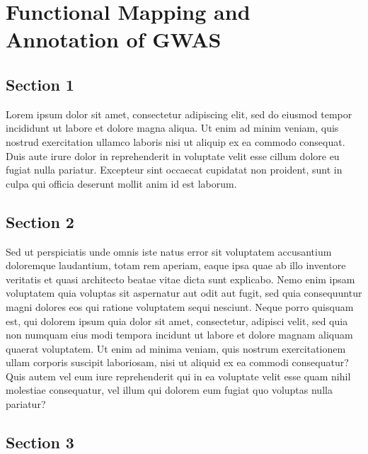 \documentclass[
]{book}
\begin{document}
\hypertarget{functional-mapping-and-annotation-of-gwas}{%
\chapter{Functional Mapping and Annotation of GWAS}\label{functional-mapping-and-annotation-of-gwas}}

\hypertarget{section-1-5}{%
\section{Section 1}\label{section-1-5}}

Lorem ipsum dolor sit amet, consectetur adipiscing elit, sed do eiusmod tempor incididunt ut labore et dolore magna aliqua. Ut enim ad minim veniam, quis nostrud exercitation ullamco laboris nisi ut aliquip ex ea commodo consequat. Duis aute irure dolor in reprehenderit in voluptate velit esse cillum dolore eu fugiat nulla pariatur. Excepteur sint occaecat cupidatat non proident, sunt in culpa qui officia deserunt mollit anim id est laborum.

\hypertarget{section-2-5}{%
\section{Section 2}\label{section-2-5}}

Sed ut perspiciatis unde omnis iste natus error sit voluptatem accusantium doloremque laudantium, totam rem aperiam, eaque ipsa quae ab illo inventore veritatis et quasi architecto beatae vitae dicta sunt explicabo. Nemo enim ipsam voluptatem quia voluptas sit aspernatur aut odit aut fugit, sed quia consequuntur magni dolores eos qui ratione voluptatem sequi nesciunt. Neque porro quisquam est, qui dolorem ipsum quia dolor sit amet, consectetur, adipisci velit, sed quia non numquam eius modi tempora incidunt ut labore et dolore magnam aliquam quaerat voluptatem. Ut enim ad minima veniam, quis nostrum exercitationem ullam corporis suscipit laboriosam, nisi ut aliquid ex ea commodi consequatur? Quis autem vel eum iure reprehenderit qui in ea voluptate velit esse quam nihil molestiae consequatur, vel illum qui dolorem eum fugiat quo voluptas nulla pariatur?

\hypertarget{section-3-5}{%
\section{Section 3}\label{section-3-5}}
\end{document}
